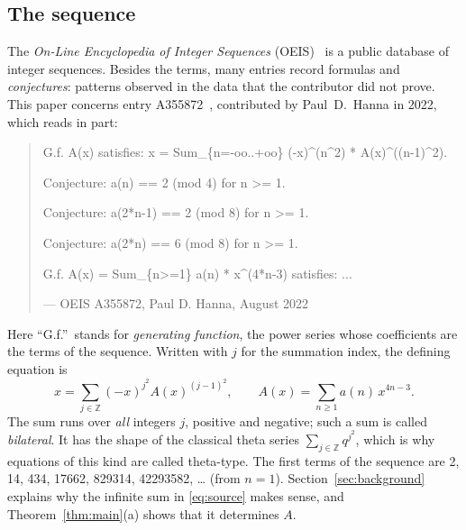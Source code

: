 \documentclass[11pt,a4paper]{article}
\theoremstyle{definition}
\theoremstyle{remark}
\newcommand{\Z}{\mathbb{Z}}
\begin{document}
\subsection{The sequence}\label{sec:sequence}
The \emph{On-Line Encyclopedia of Integer Sequences} (OEIS)~\cite{oeisdb} is a public database of integer sequences.
Besides the terms, many entries record formulas and \emph{conjectures}: patterns observed in the data that the
contributor did not prove. This paper concerns entry A355872~\cite{oeis}, contributed by Paul~D.~Hanna in 2022, which
reads in part:
\begin{quote}\small\ttfamily\raggedright G.f. A(x) satisfies: x = Sum\_\{n=-oo..+oo\} (-x)\^{}(n\^{}2) * A(x)\^{}((n-1)\^{}2).\par\smallskip Conjecture: a(n) == 2 (mod 4) for n >= 1.\par\smallskip Conjecture: a(2*n-1) == 2 (mod 8) for n >= 1.\par\smallskip Conjecture: a(2*n) == 6 (mod 8) for n >= 1.\par\smallskip G.f. A(x) = Sum\_\{n>=1\} a(n) * x\^{}(4*n-3) satisfies: ...\par\smallskip\hfill\textrm{--- OEIS A355872, Paul D. Hanna, August 2022}\end{quote}

Here ``G.f.''\ stands for \emph{generating function}, the power series whose coefficients are the terms of the
sequence. Written with $j$ for the summation index, the defining equation is
\begin{equation}\label{eq:source}
x=\sum_{j\in\Z}(-x)^{j^2}A(x)^{(j-1)^2},\qquad A(x)=\sum_{n\ge1}a(n)\,x^{4n-3}.
\end{equation}
The sum runs over \emph{all} integers $j$, positive and negative; such a sum is called \emph{bilateral}. It has the
shape of the classical theta series $\sum_{j\in\Z}q^{j^2}$, which is why equations of this kind are called
theta-type. The first terms of the sequence are 2, 14, 434, 17662, 829314, 42293582, \dots{} (from $n=1$).
Section~\ref{sec:background} explains why the infinite sum in \eqref{eq:source} makes sense, and Theorem~\ref{thm:main}(a) shows that it
determines $A$.
\end{document}
